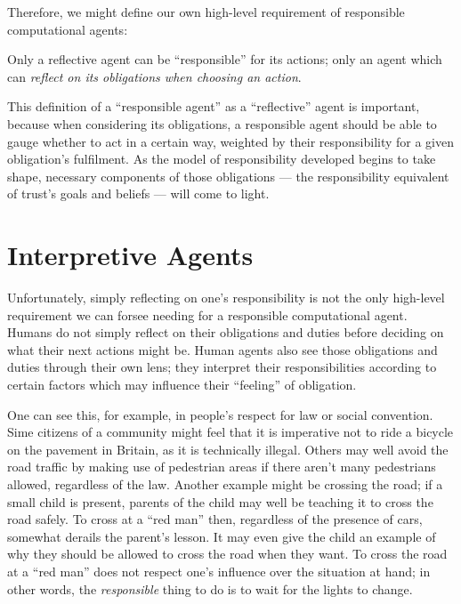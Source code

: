 Therefore, we might define our own high-level requirement of responsible computational agents:

\begin{displayquote}
    Only a reflective agent can be ``responsible'' for its actions; only an agent which can \emph{reflect on its obligations when choosing an action}.
\end{displayquote}\par

This definition of a ``responsible agent'' as a ``reflective'' agent is important, because when considering its obligations, a responsible agent should be able to gauge whether to act in a certain way, weighted by their responsibility for a given obligation's fulfilment. As the model of responsibility developed begins to take shape, necessary components of those obligations --- the responsibility equivalent of trust's goals and beliefs --- will come to light.\par

\section{Interpretive Agents}
Unfortunately, simply reflecting on one's responsibility is not the only high-level requirement we can forsee needing for a responsible computational agent. Humans do not simply reflect on their obligations and duties before deciding on what their next actions might be. Human agents also see those obligations and duties through their own lens; they interpret their responsibilities according to certain factors which may influence their ``feeling'' of obligation.\par

One can see this, for example, in people's respect for law or social convention. Sime citizens of a community might feel that it is imperative not to ride a bicycle on the pavement in Britain, as it is technically illegal. Others may well avoid the road traffic by making use of pedestrian areas if there aren't many pedestrians allowed, regardless of the law. Another example might be crossing the road; if a small child is present, parents of the child may well be teaching it to cross the road safely. To cross at a ``red man'' then, regardless of the presence of cars, somewhat derails the parent's lesson. It may even give the child an example of why they should be allowed to cross the road when they want. To cross the road at a ``red man'' does not respect one's influence over the situation at hand; in other words, the \emph{responsible} thing to do is to wait for the lights to change.\par

